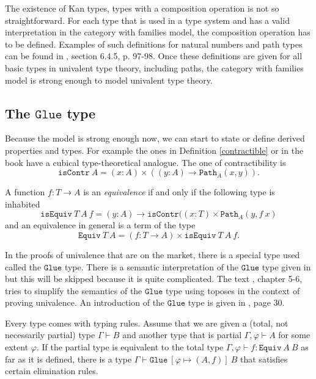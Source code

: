 \documentclass[11pt,a4paper,twoside,xetex,draft]{book}
\newcommand{\keyword}[1]{\emph{#1}\index{#1}}
\newcommand{\op}[1]{\mathtt{#1}}
\newcommand{\pa}[3]{\op{Path}_{#1}\left(#2, #3\right)}
\newcommand{\isequiv}[3]{\op{isEquiv} \ #1 \ #2 \ #3}
\begin{document}
The existence of Kan types, types with a composition operation is not so straightforward. For each type that is used in a type system and has a valid interpretation in the category with families model, the composition operation has to be defined. Examples of such definitions for natural numbers and path types can be found in \cite{Huber2016}, section 6.4.5, p. 97-98. Once these definitions are given for all basic types in univalent type theory, including paths, the category with families model is strong enough to model univalent type theory.



\subsection{The $\op{Glue}$ type}


Because the model is strong enough now, we can start to state or define derived properties and types. For example the ones in Definition \ref{contractible} or in the book \cite{Voevodsky2013} have a cubical type-theoretical analogue. The one of contractibility is $$\op{isContr} \ A = (x:A) \times \left( (y:A) \rightarrow \pa{A}{x}{y} \right).$$

A function $f:T \rightarrow A$ is an \keyword{equivalence} if and only if the following type is inhabited $$\isequiv{T}{A}{f} = (y: A) \rightarrow \op{isContr} ((x:T) \times \pa{A}{y}{f \ x}$$  and an equivalence in general is a term of the type $$\op{Equiv} \ T \ A = (f:T\rightarrow A) \times \isequiv{T}{A}{f}.$$ 
 

In the proofs of univalence that are on the market, there is a special type used called the $\op{Glue}$ type. There is a semantic interpretation of the $\op{Glue}$ type given in \cite{Huber2016} but this will be skipped because it is quite complicated. The text \cite{Orton2019}, chapter 5-6, tries to simplify the semantics of the $\op{Glue}$ type using toposes in the context of proving univalence. An introduction of the $\op{Glue}$ type is given in \cite{Orton2019}, page 30.

Every type comes with typing rules. Assume that we are given a (total, not necessarily partial) type $\Gamma \vdash B$ and another type that is partial $\Gamma, \varphi \vdash A$ for some extent $\varphi$. If the partial type is equivalent to the total type $\Gamma, \varphi \vdash f : \op{Equiv} \ A \ B $ as far as it is defined, there is a type $\Gamma \vdash \op{Glue} \ \left[ \varphi \mapsto \left( A, f \right) \right] \ B$ that satisfies certain elimination rules. 
\end{document}
